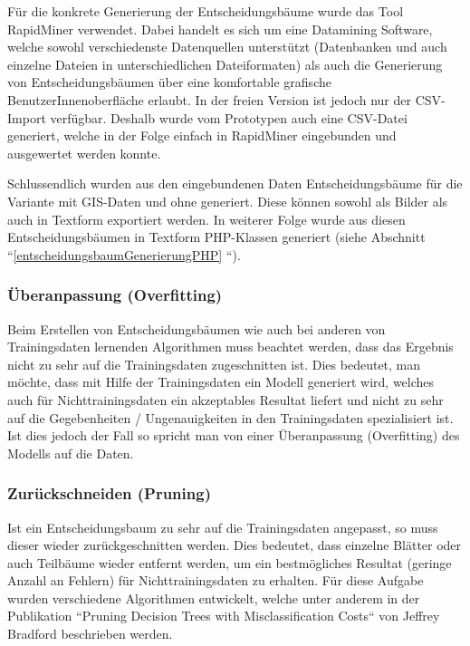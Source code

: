Für die konkrete Generierung der Entscheidungsbäume wurde das Tool RapidMiner verwendet. Dabei handelt es sich um eine Datamining Software, welche sowohl verschiedenste Datenquellen unterstützt (Datenbanken und auch einzelne Dateien in unterschiedlichen Dateiformaten) als auch die Generierung von Entscheidungsbäumen über eine komfortable grafische BenutzerInnenoberfläche erlaubt. In der freien Version ist jedoch nur der CSV-Import verfügbar. Deshalb wurde vom Prototypen auch eine CSV-Datei generiert, welche in der Folge einfach in RapidMiner eingebunden und ausgewertet werden konnte. 

Schlussendlich wurden aus den eingebundenen Daten Entscheidungsbäume für die Variante mit GIS-Daten und ohne generiert. Diese können sowohl als Bilder als auch in Textform exportiert werden. In weiterer Folge wurde aus diesen Entscheidungsbäumen in Textform PHP-Klassen generiert (siehe Abschnitt ``\ref{entscheidungsbaumGenerierungPHP} ``).

\subsubsection{Überanpassung (Overfitting)}
Beim Erstellen von Entscheidungsbäumen wie auch bei anderen von Trainingsdaten lernenden Algorithmen muss beachtet werden, dass das Ergebnis nicht zu sehr auf die Trainingsdaten zugeschnitten ist. Dies bedeutet, man möchte, dass mit Hilfe der Trainingsdaten ein Modell generiert wird, welches auch für Nichttrainingsdaten ein akzeptables Resultat liefert und nicht zu sehr auf die Gegebenheiten / Ungenauigkeiten in den Trainingsdaten spezialisiert ist. Ist dies jedoch der Fall so spricht man von einer Überanpassung (Overfitting) des Modells auf die Daten.  \cite{tom_dietterich_overfitting_1995}

\subsubsection{Zurückschneiden (Pruning)}
Ist ein Entscheidungsbaum zu sehr  auf die Trainingsdaten angepasst, so muss dieser wieder zurückgeschnitten werden. Dies bedeutet, dass einzelne Blätter oder auch Teilbäume wieder entfernt werden, um ein bestmögliches Resultat (geringe Anzahl an Fehlern) für Nichttrainingsdaten zu erhalten. Für diese Aufgabe wurden verschiedene Algorithmen entwickelt, welche unter anderem in der Publikation ``Pruning Decision Trees with Misclassification Costs`` von Jeffrey Bradford beschrieben werden. \cite{jeffrey_p._bradford_pruning_1998}

